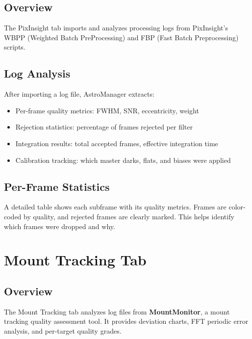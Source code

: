 \documentclass[11pt,a4paper]{article}
\begin{document}
\subsection{Overview}

The PixInsight tab imports and analyzes processing logs from PixInsight's WBPP (Weighted Batch PreProcessing) and FBP (Fast Batch Preprocessing) scripts.

\subsection{Log Analysis}

After importing a log file, AstroManager extracts:
\begin{itemize}
    \item Per-frame quality metrics: FWHM, SNR, eccentricity, weight
    \item Rejection statistics: percentage of frames rejected per filter
    \item Integration results: total accepted frames, effective integration time
    \item Calibration tracking: which master darks, flats, and biases were applied
\end{itemize}

\subsection{Per-Frame Statistics}

A detailed table shows each subframe with its quality metrics. Frames are color-coded by quality, and rejected frames are clearly marked. This helps identify which frames were dropped and why.


\section{Mount Tracking Tab}
\label{sec:mount}

\subsection{Overview}

The Mount Tracking tab analyzes log files from \textbf{MountMonitor}, a mount tracking quality assessment tool. It provides deviation charts, FFT periodic error analysis, and per-target quality grades.
\end{document}
